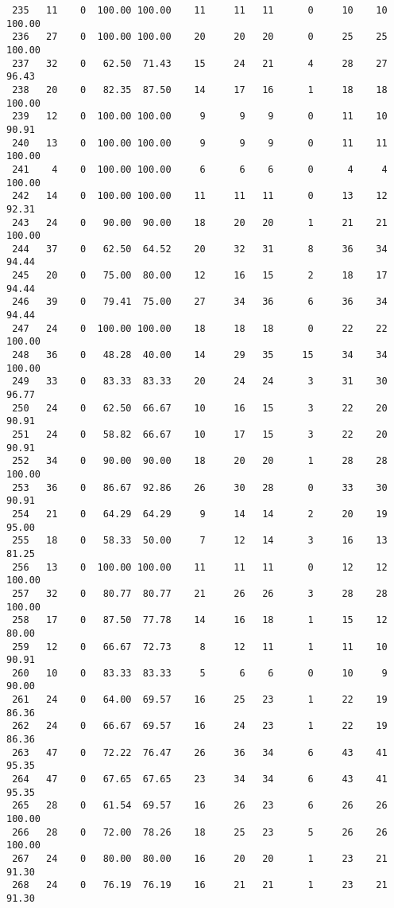 \begin{verbatim}
 235   11    0  100.00 100.00    11     11   11      0     10    10   100.00
 236   27    0  100.00 100.00    20     20   20      0     25    25   100.00
 237   32    0   62.50  71.43    15     24   21      4     28    27    96.43
 238   20    0   82.35  87.50    14     17   16      1     18    18   100.00
 239   12    0  100.00 100.00     9      9    9      0     11    10    90.91
 240   13    0  100.00 100.00     9      9    9      0     11    11   100.00
 241    4    0  100.00 100.00     6      6    6      0      4     4   100.00
 242   14    0  100.00 100.00    11     11   11      0     13    12    92.31
 243   24    0   90.00  90.00    18     20   20      1     21    21   100.00
 244   37    0   62.50  64.52    20     32   31      8     36    34    94.44
 245   20    0   75.00  80.00    12     16   15      2     18    17    94.44
 246   39    0   79.41  75.00    27     34   36      6     36    34    94.44
 247   24    0  100.00 100.00    18     18   18      0     22    22   100.00
 248   36    0   48.28  40.00    14     29   35     15     34    34   100.00
 249   33    0   83.33  83.33    20     24   24      3     31    30    96.77
 250   24    0   62.50  66.67    10     16   15      3     22    20    90.91
 251   24    0   58.82  66.67    10     17   15      3     22    20    90.91
 252   34    0   90.00  90.00    18     20   20      1     28    28   100.00
 253   36    0   86.67  92.86    26     30   28      0     33    30    90.91
 254   21    0   64.29  64.29     9     14   14      2     20    19    95.00
 255   18    0   58.33  50.00     7     12   14      3     16    13    81.25
 256   13    0  100.00 100.00    11     11   11      0     12    12   100.00
 257   32    0   80.77  80.77    21     26   26      3     28    28   100.00
 258   17    0   87.50  77.78    14     16   18      1     15    12    80.00
 259   12    0   66.67  72.73     8     12   11      1     11    10    90.91
 260   10    0   83.33  83.33     5      6    6      0     10     9    90.00
 261   24    0   64.00  69.57    16     25   23      1     22    19    86.36
 262   24    0   66.67  69.57    16     24   23      1     22    19    86.36
 263   47    0   72.22  76.47    26     36   34      6     43    41    95.35
 264   47    0   67.65  67.65    23     34   34      6     43    41    95.35
 265   28    0   61.54  69.57    16     26   23      6     26    26   100.00
 266   28    0   72.00  78.26    18     25   23      5     26    26   100.00
 267   24    0   80.00  80.00    16     20   20      1     23    21    91.30
 268   24    0   76.19  76.19    16     21   21      1     23    21    91.30

\end{verbatim}
